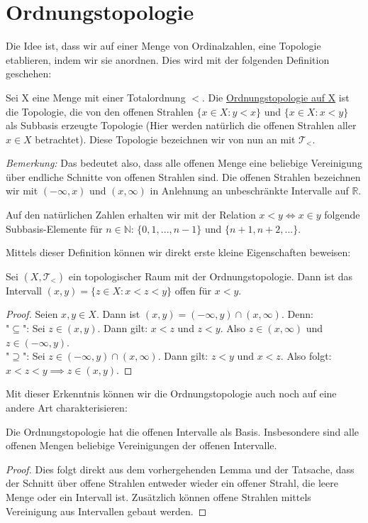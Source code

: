 \documentclass[11pt]{scrartcl}
\newcommand{\R}{\mathbb{R}}
\newcommand{\N}{\mathbb{N}}
\begin{document}
\section{Ordnungstopologie}
Die Idee ist, dass wir auf einer Menge von Ordinalzahlen, eine Topologie etablieren, indem wir sie anordnen. Dies wird mit der folgenden Definition geschehen:
\begin{definition}
Sei X eine Menge mit einer Totalordnung $<$. Die \underline{Ordnungstopologie auf X} ist die Topologie, die von den offenen Strahlen $\{ x\in X: y < x\}$ und $\{ x\in X: x<y\}$ als Subbasis erzeugte Topologie (Hier werden natürlich die offenen Strahlen aller $x\in X$ betrachtet). Diese Topologie bezeichnen wir von nun an mit $\mathcal T_{<}$.
\end{definition}
\noindent \textit{Bemerkung:} Das bedeutet also, dass alle offenen Menge eine beliebige Vereinigung über endliche Schnitte von offenen Strahlen sind. Die offenen Strahlen bezeichnen wir mit $(-\infty,x)$ und $(x,\infty)$ in Anlehnung an unbeschränkte Intervalle auf $\R$.
\begin{example}
	Auf den natürlichen Zahlen erhalten wir mit der Relation $x<y \iff x\in y$ folgende Subbasis-Elemente für $n\in\N$: $\{ 0,1,...,n-1\}$ und $\{n+1, n+2,...\}$.
\end{example}
Mittels dieser Definition können wir direkt erste kleine Eigenschaften beweisen:
\begin{lemma}
Sei $(X, \mathcal T_{<})$ ein topologischer Raum mit der Ordnungstopologie. Dann ist das Intervall $(x,y)=\{ z\in X: x < z < y\}$ offen für $x<y$.
\end{lemma}
\begin{proof}
	Seien $x,y\in X$. Dann ist $(x,y)=(-\infty,y)\cap (x,\infty)$. Denn:\\
	"$\subseteq$": Sei $z\in (x,y)$. Dann gilt: $x < z$ und $z < y$. Also $z\in (x,\infty)$ und $z\in (-\infty,y)$. \\
	"$\supseteq$": Sei $z\in (-\infty,y)\cap (x,\infty)$. Dann gilt: $z < y$ und $x<z$. Also folgt: $x<z<y\implies z\in (x,y)$.
\end{proof}
Mit dieser Erkenntnis können wir die Ordnungstopologie auch noch auf eine andere Art charakterisieren:
\begin{corollary}
	Die Ordnungstopologie hat die offenen Intervalle als Basis. Insbesondere sind alle offenen Mengen beliebige Vereinigungen der offenen Intervalle.
\end{corollary}
\begin{proof}
	Dies folgt direkt aus dem vorhergehenden Lemma und der Tatsache, dass der Schnitt über offene Strahlen entweder wieder ein offener Strahl, die leere Menge oder ein Intervall ist. Zusätzlich können offene Strahlen mittels Vereinigung aus Intervallen gebaut werden. 
\end{proof}
\end{document}
